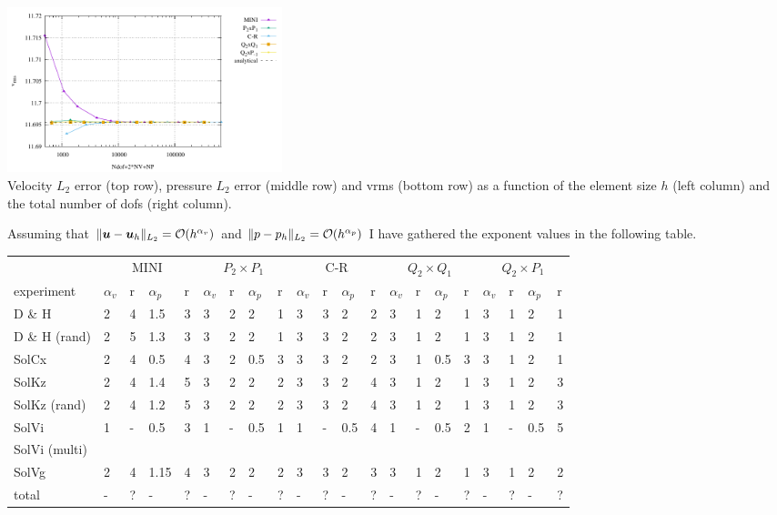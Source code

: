 \begin{center}
\includegraphics[width=8cm]{python_codes/fieldstone_112/results/exp6/vrms_ndof.pdf}\\
{\captionfont Velocity $L_2$ error (top row), pressure $L_2$ error (middle row) and vrms (bottom row) 
as a function of the element size $h$ (left column) and the total number of dofs (right column).}
\end{center}






\newpage




Assuming that $
\| {\bm u} - {\bm u}_h \|_{L_2} = {\cal O}(h^{\alpha_v})
$ and $
\| p - p_h \|_{L_2} = {\cal O}(h^{\alpha_p})
$
I have gathered the exponent values in the following 
table. 


\begin{tabular}{|l|llll|llll|llll|llll|llll|}
\hline
& 
\multicolumn{4}{c|}{MINI}&  
\multicolumn{4}{c|}{$P_2\times P_1$}  & 
\multicolumn{4}{c|}{C-R}  & 
\multicolumn{4}{c|}{$Q_2\times Q_1$} &  
\multicolumn{4}{c|}{$Q_2\times P_1$}  \\
experiment      & 
$\alpha_v$ & r  &  $\alpha_p$ & r &  
$\alpha_v$ & r  &  $\alpha_p$ & r &  
$\alpha_v$ & r  &  $\alpha_p$ & r &  
$\alpha_v$ & r  & $\alpha_p$ & r &   
$\alpha_v$ & r  & $\alpha_p$ & r \\
\hline
\hline
D \& H 
&{2}&4&1.5&3
&{3}&2&2&1
&{3}&3&2&2
&{3}&1&2&1
&{3}&1&2&1\\
D \& H (rand)
&2&5&1.3&3
&3&2&2&1
&3&3&2&2
&3&1&2&1
&3&1&2&1 \\
SolCx 
&2&4&0.5&4
&3&2&0.5&3
&3&3&2&2
&3&1&0.5&3
&3&1&2&1\\
SolKz 
&2&4&1.4&5
&3&2&2&2
&3&3&2&4
&3&1&2&1
&3&1&2&3\\
SolKz (rand)
&2&4&1.2&5
&3&2&2&2
&3&3&2&4
&3&1&2&1
&3&1&2&3\\
SolVi 
&1&-&0.5&3
&1&-&0.5&1
&1&-&0.5&4
&1&-&0.5&2
&1&-&0.5&5\\
SolVi (multi) \\ 
SolVg &
2&4&1.15&4&
3&2&2&2&
3&3&2&3&
3&1&2&1&
3&1&2&2\\
\hline
total  
&-&?&-&?
&-&?&-&?
&-&?&-&?
&-&?&-&?
&-&?&-&?\\
\hline
\end{tabular}

